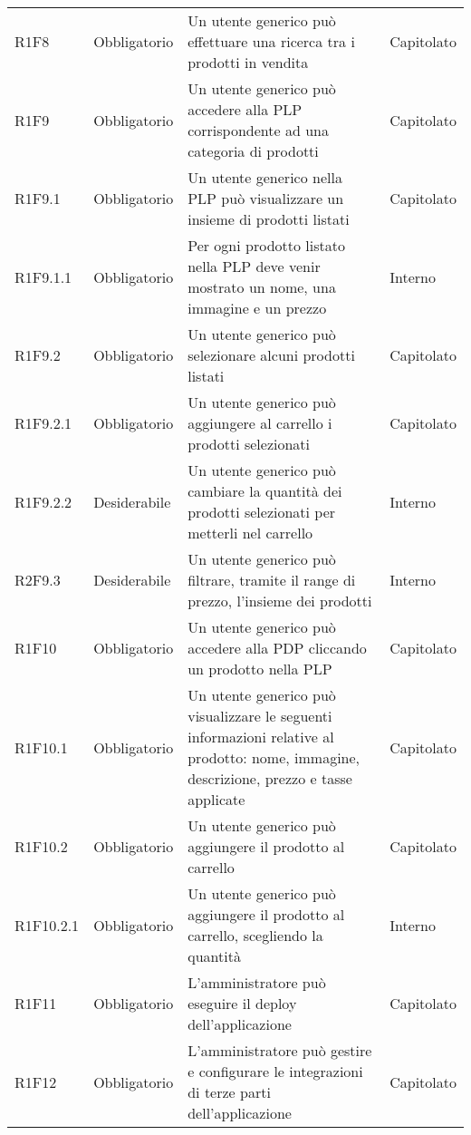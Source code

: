 {\begin{longtable}{C{2.5cm} C{2.8cm} C{6.7cm} C{2.5cm}}

R1F8 & Obbligatorio & Un utente generico può effettuare una ricerca tra i prodotti in vendita & Capitolato \\


R1F9 & Obbligatorio & Un utente generico può accedere alla PLP corrispondente ad una categoria di prodotti & Capitolato \\
R1F9.1 & Obbligatorio & Un utente generico nella PLP può visualizzare un insieme di prodotti listati & Capitolato \\
R1F9.1.1 & Obbligatorio & Per ogni prodotto listato nella PLP deve venir mostrato un nome, una immagine e un prezzo & Interno \\
R1F9.2 & Obbligatorio & Un utente generico può selezionare alcuni prodotti listati & Capitolato \\
R1F9.2.1 & Obbligatorio & Un utente generico può aggiungere al carrello i prodotti selezionati & Capitolato \\
R1F9.2.2 & Desiderabile & Un utente generico può cambiare la quantità dei prodotti selezionati per metterli nel carrello & Interno \\
R2F9.3 & Desiderabile & Un utente generico può filtrare, tramite il range di prezzo, l'insieme dei prodotti & Interno \\


R1F10 & Obbligatorio & Un utente generico può accedere alla PDP cliccando un prodotto nella PLP & Capitolato \\
R1F10.1 & Obbligatorio & Un utente generico può visualizzare le seguenti informazioni relative al prodotto: nome, immagine, descrizione, prezzo e tasse applicate & Capitolato \\
R1F10.2 & Obbligatorio & Un utente generico può aggiungere il prodotto al carrello & Capitolato \\
R1F10.2.1 & Obbligatorio & Un utente generico può aggiungere il prodotto al carrello, scegliendo la quantità & Interno \\


R1F11 & Obbligatorio & L'amministratore può eseguire il deploy dell'applicazione & Capitolato \\
R1F12 & Obbligatorio & L'amministratore può gestire e configurare le integrazioni di terze parti dell'applicazione & Capitolato \\

\end{longtable}

}
